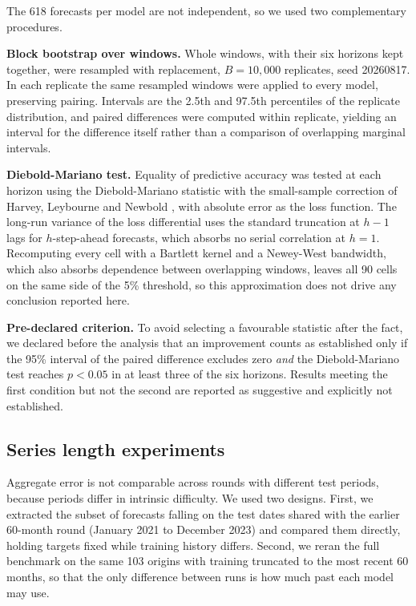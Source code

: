 The 618 forecasts per model are not independent, so we used two complementary procedures.

\textbf{Block bootstrap over windows.} Whole windows, with their six horizons kept
together, were resampled with replacement, $B=10{,}000$ replicates, seed 20260817. In each
replicate the same resampled windows were applied to every model, preserving pairing.
Intervals are the 2.5th and 97.5th percentiles of the replicate distribution, and paired
differences were computed within replicate, yielding an interval for the difference itself
rather than a comparison of overlapping marginal intervals.

\textbf{Diebold-Mariano test.} Equality of predictive accuracy was tested at each horizon
using the Diebold-Mariano statistic \citep{diebold1995} with the small-sample correction of
Harvey, Leybourne and Newbold \citep{harvey1997}, with absolute error as the loss function.
The long-run variance of the loss differential uses the standard truncation at $h-1$ lags
for $h$-step-ahead forecasts, which absorbs no serial correlation at $h=1$. Recomputing
every cell with a Bartlett kernel and a Newey-West bandwidth, which also absorbs dependence
between overlapping windows, leaves all 90 cells on the same side of the 5\% threshold, so
this approximation does not drive any conclusion reported here.

\textbf{Pre-declared criterion.} To avoid selecting a favourable statistic after the fact,
we declared before the analysis that an improvement counts as established only if the 95\%
interval of the paired difference excludes zero \emph{and} the Diebold-Mariano test reaches
$p<0.05$ in at least three of the six horizons. Results meeting the first condition but not
the second are reported as suggestive and explicitly not established.

\subsection{Series length experiments}

Aggregate error is not comparable across rounds with different test periods, because
periods differ in intrinsic difficulty. We used two designs. First, we extracted the subset
of forecasts falling on the test dates shared with the earlier 60-month round (January 2021
to December 2023) and compared them directly, holding targets fixed while training history
differs. Second, we reran the full benchmark on the same 103 origins with training
truncated to the most recent 60 months, so that the only difference between runs is how
much past each model may use.

